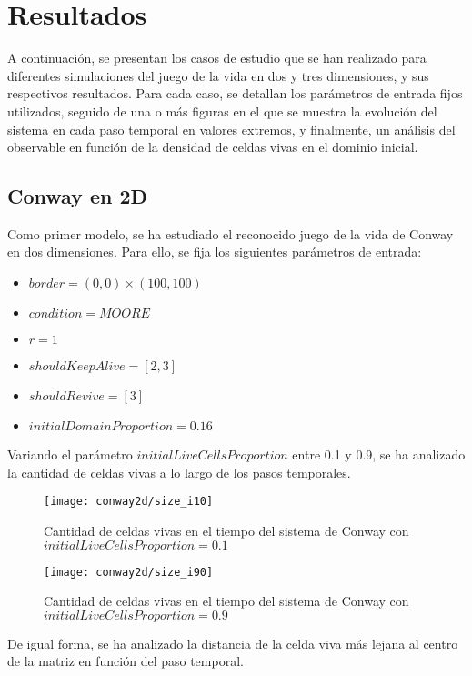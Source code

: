 \section{Resultados}\label{sec:resultados}
A continuación, se presentan los casos de estudio que se han realizado para diferentes simulaciones del juego
de la vida en dos y tres dimensiones, y sus respectivos resultados.
Para cada caso, se detallan los parámetros de entrada fijos utilizados, seguido de una o más figuras en el que
se muestra la evolución del sistema en cada paso temporal en valores extremos, y finalmente, un análisis del
observable en función de la densidad de celdas vivas en el dominio inicial.

\subsection{Conway en 2D}\label{subsec:conway-en-2d}

Como primer modelo, se ha estudiado el reconocido juego de la vida de Conway en dos dimensiones.
Para ello, se fija los siguientes parámetros de entrada:

\begin{itemize}
    \item $border = (0, 0) \times (100, 100)$
    \item $condition = MOORE$
    \item $r = 1$
    \item $shouldKeepAlive = [2, 3]$
    \item $shouldRevive = [3]$
    \item $initialDomainProportion = 0.16$
\end{itemize}
Variando el parámetro $initialLiveCellsProportion$ entre 0.1 y 0.9, se ha analizado la cantidad de celdas vivas
a lo largo de los pasos temporales.
\begin{figure}[H]
    \centering
    \texttt{[image: conway2d/size\_i10]}
    \caption{Cantidad de celdas vivas en el tiempo del sistema de Conway con $initialLiveCellsProportion = 0.1$}
    \label{fig:conway2d_i10}
\end{figure}
\begin{figure}[H]
    \centering
    \texttt{[image: conway2d/size\_i90]}
    \caption{Cantidad de celdas vivas en el tiempo del sistema de Conway con $initialLiveCellsProportion = 0.9$}
    \label{fig:conway2d_i90}
\end{figure}

De igual forma, se ha analizado la distancia de la celda viva más lejana al centro de la matriz en función del
paso temporal.

